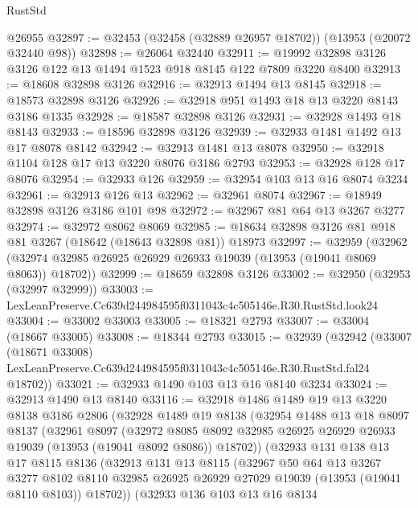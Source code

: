 \begin{lexlean}{RustStd}
\begin{coremodule}
    @26955
@32897 := @32453 (@32458 (@32889 @26957 @18702)) (@13953 (@20072 @32440 @98))
@32898 := @26064 @32440
@32911 := @19992 @32898 @3126 @3126 @122 @13 @1494 @1523 @918 @8145 @122 @7809 @3220 @8400
@32913 := @18608 @32898 @3126
@32916 := @32913 @1494 @13 @8145
@32918 := @18573 @32898 @3126
@32926 := @32918 @951 @1493 @18 @13 @3220 @8143 @3186 @1335
@32928 := @18587 @32898 @3126
@32931 := @32928 @1493 @18 @8143
@32933 := @18596 @32898 @3126
@32939 := @32933 @1481 @1492 @13 @17 @8078 @8142
@32942 := @32913 @1481 @13 @8078
@32950 := @32918 @1104 @128 @17 @13 @3220 @8076 @3186 @2793
@32953 := @32928 @128 @17 @8076
@32954 := @32933 @126
@32959 := @32954 @103 @13 @16 @8074 @3234
@32961 := @32913 @126 @13
@32962 := @32961 @8074
@32967 := @18949 @32898 @3126 @3186 @101 @98
@32972 := @32967 @81 @64 @13 @3267 @3277
@32974 := @32972 @8062 @8069
@32985 := @18634 @32898 @3126 @81 @918 @81 @3267 (@18642 (@18643 @32898 @81)) @18973
@32997 := @32959
    (@32962 (@32974 @32985 @26925 @26929 @26933 @19039 (@13953 (@19041 @8069 @8063)) @18702))
@32999 := @18659 @32898 @3126
@33002 := @32950 (@32953 (@32997 @32999))
@33003 := LexLeanPreserve.Cc639d244984595f0311043c4c505146e.R30.RustStd.look24
@33004 := @33002 @33003
@33005 := @18321 @2793
@33007 := @33004 (@18667 @33005)
@33008 := @18344 @2793
@33015 := @32939
    (@32942
      (@33007
        (@18671 @33008)
        LexLeanPreserve.Cc639d244984595f0311043c4c505146e.R30.RustStd.fal24
        @18702))
@33021 := @32933 @1490 @103 @13 @16 @8140 @3234
@33024 := @32913 @1490 @13 @8140
@33116 := @32918
    @1486
    @1489
    @19
    @13
    @3220
    @8138
    @3186
    @2806
    (@32928
      @1489
      @19
      @8138
      (@32954
        @1488
        @13
        @18
        @8097
        @8137
        (@32961
          @8097
          (@32972
            @8085
            @8092
            @32985
            @26925
            @26929
            @26933
            @19039
            (@13953 (@19041 @8092 @8086))
            @18702))
        (@32933
          @131
          @138
          @13
          @17
          @8115
          @8136
          (@32913
            @131
            @13
            @8115
            (@32967
              @50
              @64
              @13
              @3267
              @3277
              @8102
              @8110
              @32985
              @26925
              @26929
              @27029
              @19039
              (@13953 (@19041 @8110 @8103))
              @18702))
          (@32933
            @136
            @103
            @13
            @16
            @8134

\end{coremodule}
\end{lexlean}
